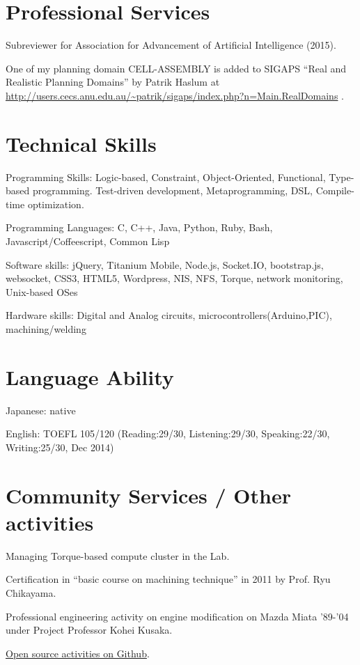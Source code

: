 \documentclass[letterpaper]{article}
\begin{document}
\renewcommand{\refname}{Publications}

\let\uline\relax
\nocite{Asai2014}
\nocite{Asai2014b}
\nocite{Asai2015}




\section{Professional Services}

Subreviewer for Association for Advancement of Artificial Intelligence (2015).

One of my planning domain CELL-ASSEMBLY is added to SIGAPS ``Real and
Realistic Planning Domains'' by Patrik Haslum at
\url{http://users.cecs.anu.edu.au/~patrik/sigaps/index.php?n=Main.RealDomains}
.

\section{Technical Skills}

\begin{CV}
 \item[Programming Skills:] Logic-based, Constraint, Object-Oriented,
 Functional, Type-based programming. Test-driven development, Metaprogramming, DSL, Compile-time optimization.
 \item[Programming Languages:] C, C++, Java, Python, Ruby, Bash, Javascript/Coffeescript, Common Lisp
 \item[Software skills:] jQuery, Titanium Mobile,
 Node.js, Socket.IO, bootstrap.js, websocket, CSS3, HTML5, Wordpress, NIS, NFS,
 Torque, network monitoring, Unix-based OSes
 \item[Hardware skills:] Digital and Analog circuits, microcontrollers(Arduino,PIC), machining/welding
\end{CV}

\section{Language Ability}

\begin{CV}
 \item[Japanese:] native
 \item[English:] TOEFL 105/120 (Reading:29/30, Listening:29/30, Speaking:22/30, Writing:25/30, Dec 2014)
\end{CV}

\section{Community Services / Other activities}

Managing Torque-based compute cluster in the Lab.

Certification in ``basic course on machining technique'' in 2011 by Prof. Ryu Chikayama.

Professional engineering activity on engine modification
on Mazda Miata '89-'04 under Project Professor Kohei Kusaka.

\href{https://github.com/guicho271828}{Open source activities on Github}.
\end{document}

